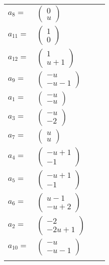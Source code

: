 \documentclass[1p]{elsarticle_modified}
\theoremstyle{definition}
\begin{document}
\begin{tabular}{m{7pt} m{180pt} m{7pt} m{180pt} }
\flushright $a_{8}=$&$\begin{pmatrix}0\\u\end{pmatrix}$ \\
\flushright $a_{11}=$&$\begin{pmatrix}1\\0\end{pmatrix}$ \\
\flushright $a_{12}=$&$\begin{pmatrix}1\\u+1\end{pmatrix}$ \\
\flushright $a_{9}=$&$\begin{pmatrix}- u\\- u-1\end{pmatrix}$ \\
\flushright $a_{1}=$&$\begin{pmatrix}- u\\- u\end{pmatrix}$ \\
\flushright $a_{3}=$&$\begin{pmatrix}- u\\-2\end{pmatrix}$ \\
\flushright $a_{7}=$&$\begin{pmatrix}u\\u\end{pmatrix}$ \\
\flushright $a_{4}=$&$\begin{pmatrix}- u+1\\-1\end{pmatrix}$ \\
\flushright $a_{5}=$&$\begin{pmatrix}- u+1\\-1\end{pmatrix}$ \\
\flushright $a_{6}=$&$\begin{pmatrix}u-1\\- u+2\end{pmatrix}$ \\
\flushright $a_{2}=$&$\begin{pmatrix}-2\\-2 u+1\end{pmatrix}$ \\
\flushright $a_{10}=$&$\begin{pmatrix}- u\\- u-1\end{pmatrix}$\\&\end{tabular}
\end{document}
